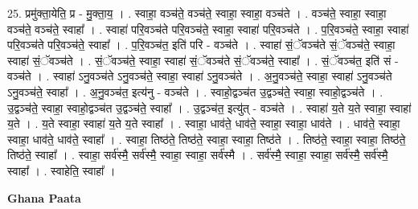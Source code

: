 \documentclass[17pt]{extarticle}
\begin{document}
25. प्रमु॑क्ता॒येति॒ प्र - मु॒क्ता॒य॒ । . स्वाहा॒ वञ्च॑ते॒ वञ्च॑ते॒ स्वाहा॒ स्वाहा॒ वञ्च॑ते । . वञ्च॑ते॒ स्वाहा॒ स्वाहा॒ वञ्च॑ते॒ वञ्च॑ते॒ स्वाहा᳚ । . स्वाहा॑ परि॒वञ्च॑ते परि॒वञ्च॑ते॒ स्वाहा॒ स्वाहा॑ परि॒वञ्च॑ते । . प॒रि॒वञ्च॑ते॒ स्वाहा॒ स्वाहा॑ परि॒वञ्च॑ते परि॒वञ्च॑ते॒ स्वाहा᳚ । . प॒रि॒वञ्च॑त॒ इति॑ परि - वञ्च॑ते । . स्वाहा॑ सं॒ॅवञ्च॑ते सं॒ॅवञ्च॑ते॒ स्वाहा॒ स्वाहा॑ सं॒ॅवञ्च॑ते । . सं॒ॅवञ्च॑ते॒ स्वाहा॒ स्वाहा॑ सं॒ॅवञ्च॑ते सं॒ॅवञ्च॑ते॒ स्वाहा᳚ । . सं॒ॅवञ्च॑त॒ इति॑ सं - वञ्च॑ते । . स्वाहा॑ ऽनु॒वञ्च॑ते ऽनु॒वञ्च॑ते॒ स्वाहा॒ स्वाहा॑ ऽनु॒वञ्च॑ते । . अ॒नु॒वञ्च॑ते॒ स्वाहा॒ स्वाहा॑ ऽनु॒वञ्च॑ते ऽनु॒वञ्च॑ते॒ स्वाहा᳚ । . अ॒नु॒वञ्च॑त॒ इत्य॑नु - वञ्च॑ते । . स्वाहो॒द्वञ्च॑त उ॒द्वञ्च॑ते॒ स्वाहा॒ स्वाहो॒द्वञ्च॑ते । . उ॒द्वञ्च॑ते॒ स्वाहा॒ स्वाहो॒द्वञ्च॑त उ॒द्वञ्च॑ते॒ स्वाहा᳚ । . उ॒द्वञ्च॑त॒ इत्यु॑त् - वञ्च॑ते । . स्वाहा॑ य॒ते य॒ते स्वाहा॒ स्वाहा॑ य॒ते । . य॒ते स्वाहा॒ स्वाहा॑ य॒ते य॒ते स्वाहा᳚ । . स्वाहा॒ धाव॑ते॒ धाव॑ते॒ स्वाहा॒ स्वाहा॒ धाव॑ते । . धाव॑ते॒ स्वाहा॒ स्वाहा॒ धाव॑ते॒ धाव॑ते॒ स्वाहा᳚ । . स्वाहा॒ तिष्ठ॑ते॒ तिष्ठ॑ते॒ स्वाहा॒ स्वाहा॒ तिष्ठ॑ते । . तिष्ठ॑ते॒ स्वाहा॒ स्वाहा॒ तिष्ठ॑ते॒ तिष्ठ॑ते॒ स्वाहा᳚ । . स्वाहा॒ सर्व॑स्मै॒ सर्व॑स्मै॒ स्वाहा॒ स्वाहा॒ सर्व॑स्मै । . सर्व॑स्मै॒ स्वाहा॒ स्वाहा॒ सर्व॑स्मै॒ सर्व॑स्मै॒ स्वाहा᳚ । . स्वाहेति॒ स्वाहा᳚ । \newline

\textbf{Ghana Paata } \newline
\end{document}
